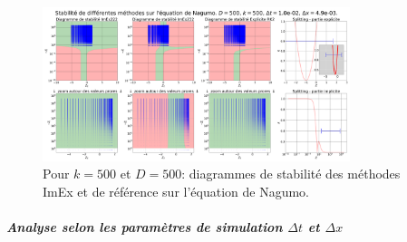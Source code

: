                 \begin{figure}[htbp]
                    \centering
                    \includegraphics[width=0.8\textwidth]{media/4_travail/2_nagumo/stabilite/STABILITE_D500_k500_dt1.0e-02_dx4.9e-03.png}
                    \caption{Pour $k=500$ et $D=500$: diagrammes de stabilité des méthodes ImEx et de référence sur l'équation de Nagumo.}
                    \label{fig:stabilite_nagumo_cas_special}
                \end{figure}
            \subparagraph{Analyse selon les paramètres de simulation $\Delta t$ et $\Delta x$}
                